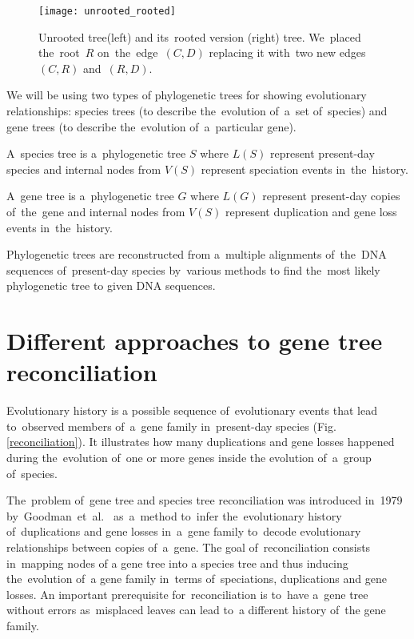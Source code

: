 \begin{figure}[ht]
	\centering
	\label{unrooted_rooted}
  	\texttt{[image: unrooted\_rooted]}
  	\caption[Unrooted tree and its~rooted version]{Unrooted tree(left) and its~rooted version (right) tree. We~placed the~root~$R$ on~the~edge~$(C, D)$ replacing it with~two new edges~$(C, R)$ and~$(R, D)$.}
\end{figure}

We will be using two types of phylogenetic trees for showing evolutionary relationships: species trees (to describe the~evolution of~a~set of~species) and gene trees (to describe the~evolution of~a~particular gene).

A~species tree is a~phylogenetic tree $S$ where $L(S)$ represent present-day species and internal nodes from $V(S)$ represent speciation events in~the~history.

A~gene tree is a~phylogenetic tree $G$ where $L(G)$ represent present-day copies of~the~gene and internal nodes from $V(S)$ represent duplication and gene loss events in~the~history.

Phylogenetic trees are reconstructed from a~multiple alignments of~the~DNA sequences of~present-day species by~various methods \cite{felsenstein} to find the~most likely phylogenetic tree to given DNA sequences.

\section{Different approaches to gene tree reconciliation}
Evolutionary history is a possible sequence of~evolutionary events that lead to~observed members of~a~gene family in~present-day species (Fig. \ref{reconciliation}). It illustrates how many duplications and gene losses happened during the~evolution of~one or more genes inside the evolution of~a~group of~species.

The~problem of~gene tree and species tree reconciliation was introduced in~1979 by~Goodman~et~al.~\cite{goodman} as~a~method to~infer the~evolutionary history of~duplications and gene losses in~a~gene family to~decode evolutionary relationships between copies of~a~gene. The goal of~reconciliation consists in~mapping nodes of a gene tree into a species tree and thus inducing the~evolution of~a gene family in~terms of~speciations, duplications and gene losses. An important prerequisite for~reconciliation is to~have a~gene tree without errors as~misplaced leaves can lead to~a different history of~the gene family.

